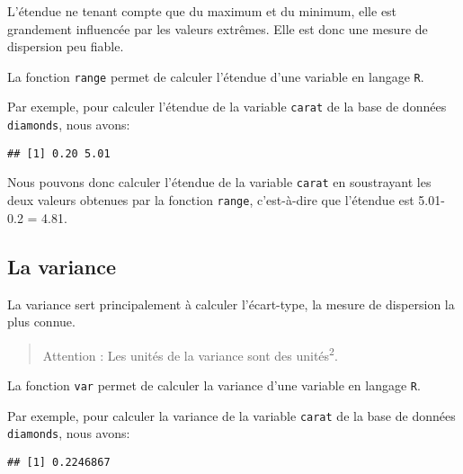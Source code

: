 \documentclass[]{book}
\newenvironment{Shaded}{\begin{snugshade}}{\end{snugshade}}
\newcommand{\KeywordTok}[1]{\textcolor[rgb]{0.13,0.29,0.53}{\textbf{#1}}}
\newcommand{\OperatorTok}[1]{\textcolor[rgb]{0.81,0.36,0.00}{\textbf{#1}}}
\newcommand{\NormalTok}[1]{#1}
\begin{document}
L'étendue ne tenant compte que du maximum et du minimum, elle est
grandement influencée par les valeurs extrêmes. Elle est donc une mesure
de dispersion peu fiable.

La fonction \texttt{range} permet de calculer l'étendue d'une variable
en langage \texttt{R}.

Par exemple, pour calculer l'étendue de la variable \texttt{carat} de la
base de données \texttt{diamonds}, nous avons:

\begin{Shaded}
\end{Shaded}

\begin{verbatim}
## [1] 0.20 5.01
\end{verbatim}

Nous pouvons donc calculer l'étendue de la variable \texttt{carat} en
soustrayant les deux valeurs obtenues par la fonction \texttt{range},
c'est-à-dire que l'étendue est 5.01-0.2 = 4.81.

\subsection{La variance}\label{la-variance}

La variance sert principalement à calculer l'écart-type, la mesure de
dispersion la plus connue.

\begin{quote}
Attention : Les unités de la variance sont des
unités\textsuperscript{2}.
\end{quote}

La fonction \texttt{var} permet de calculer la variance d'une variable
en langage \texttt{R}.

Par exemple, pour calculer la variance de la variable \texttt{carat} de
la base de données \texttt{diamonds}, nous avons:

\begin{Shaded}
\end{Shaded}

\begin{verbatim}
## [1] 0.2246867
\end{verbatim}
\end{document}
